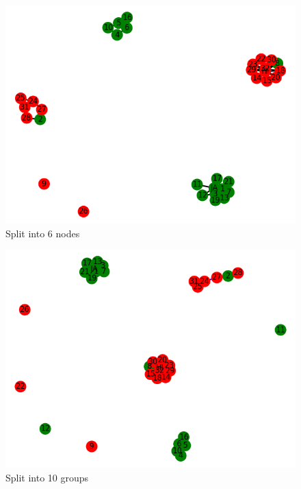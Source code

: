 \documentclass[11pt]{article}
\begin{document}
	\begin{figure}[h!]
		\includegraphics[scale=0.5]{resources/myplot21.png}
		\caption{ Split into 6 nodes }
	\end{figure}
	\begin{figure}[h!]
		\includegraphics[scale=0.5]{resources/myplot22.png}
		\caption{Split into 10 groups }
	\end{figure}
	
	
\end{document}
